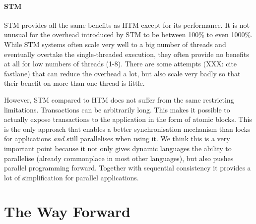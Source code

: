 \documentclass{sigplanconf}
\begin{document}

\paragraph{STM}

STM provides all the same benefits as HTM except for its performance.
It is not unusual for the overhead introduced by STM to be between
100\% to even 1000\%. While STM systems often scale very well to a big
number of threads and eventually overtake the single-threaded
execution, they often provide no benefits at all for low numbers of
threads (1-8). There are some attempts (XXX: cite fastlane) that can
reduce the overhead a lot, but also scale very badly so that their
benefit on more than one thread is little.

However, STM compared to HTM does not suffer from the same restricting
limitations. Transactions can be arbitrarily long.  This makes it
possible to actually expose transactions to the application in the
form of atomic blocks. This is the only approach that enables a better
synchronisation mechanism than locks for applications \emph{and} still
parallelises when using it. We think this is a very important point
because it not only gives dynamic languages the ability to parallelise
(already commonplace in most other languages), but also pushes
parallel programming forward. Together with sequential consistency it
provides a lot of simplification for parallel applications.



\section{The Way Forward}
\end{document}
